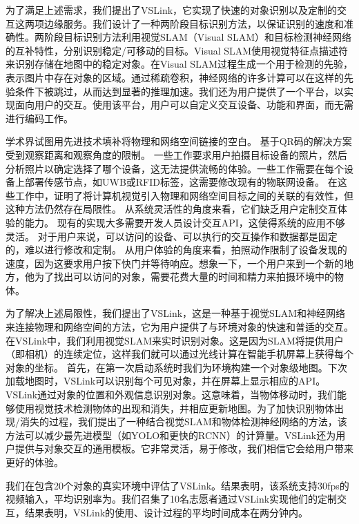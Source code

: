 为了满足上述需求，我们提出了VSLink，它实现了快速的对象识别以及定制的交互这两项边缘服务。我们设计了一种两阶段目标识别方法，以保证识别的速度和准确性。两阶段目标识别方法利用视觉SLAM（Visual SLAM）和目标检测神经网络的互补特性，分别识别稳定/可移动的目标。Visual SLAM使用视觉特征点描述符来识别存储在地图中的稳定对象。在Visual SLAM过程生成一个用于检测的先验，表示图片中存在对象的区域。通过稀疏卷积\cite{ren2018sbnet}，神经网络的许多计算可以在这样的先验条件下被跳过，从而达到显著的推理加速。我们还为用户提供了一个平台，以实现面向用户的交互。使用该平台，用户可以自定义交互设备、功能和界面，而无需进行编码工作。

学术界试图用先进技术填补将物理和网络空间链接的空白。
基于QR码的解决方案受到观察距离和观察角度的限制。
一些工作\cite{chen2018snaplink,de2016snap}要求用户拍摄目标设备的照片，然后分析照片以确定选择了哪个设备，这无法提供流畅的体验。一些工作\cite{alanwar2017selecon}需要在每个设备上部署传感节点，如UWB或RFID标签，这需要修改现有的物联网设备。
在这些工作中，\cite{chen2018snaplink}证明了将计算机视觉引入物理和网络空间目标之间的关联的有效性，但这种方法仍然存在局限性。
从系统灵活性的角度来看，它们缺乏用户定制交互体验的能力。
现有的实现大多需要开发人员设计交互API，这使得系统的应用不够灵活。
对于用户来说，可以访问的设备、可以执行的交互操作和数据都是固定的，难以进行修改和定制。
从用户体验的角度来看，拍照动作限制了设备发现的速度，因为这要求用户按下快门并等待响应。想象一下，一个用户来到一个新的地方，他为了找出可以访问的对象，需要花费大量的时间和精力来拍摄环境中的物体。

为了解决上述局限性，我们提出了VSLink，这是一种基于视觉SLAM和神经网络来连接物理和网络空间的方法，它为用户提供了与环境对象的快速和普适的交互。
在VSLink中，我们利用视觉SLAM来实时识别对象。这是因为SLAM将提供用户（即相机）的连续定位，这样我们就可以通过光线计算在智能手机屏幕上获得每个对象的坐标。
首先，在第一次启动系统时我们为环境构建一个对象级地图。下次加载地图时，VSLink可以识别每个可见对象，并在屏幕上显示相应的API。
VSLink通过对象的位置和外观信息识别对象。这意味着，当物体移动时，我们能够使用视觉技术检测物体的出现和消失，并相应更新地图。为了加快识别物体出现/消失的过程，我们提出了一种结合视觉SLAM和物体检测神经网络的方法，该方法可以减少最先进模型（如YOLO和更快的RCNN）的计算量。VSLink还为用户提供与对象交互的通用模板。它非常灵活，易于修改，我们相信它会给用户带来更好的体验。

我们在包含20个对象的真实环境中评估了VSLink。结果表明，该系统支持30fps的视频输入，平均识别率为{\acc}。我们召集了10名志愿者通过VSLink实现他们的定制交互，结果表明，VSLink的使用、设计过程的平均时间成本在两分钟内。

